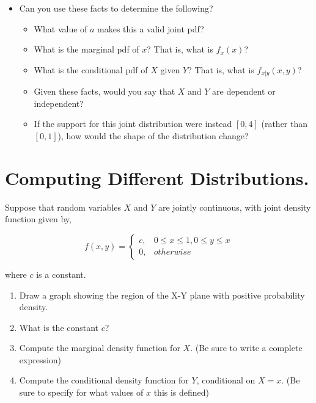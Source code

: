 \documentclass[
  letterpaper,
  DIV=11,
  numbers=noendperiod]{scrreprt}
\providecommand{\tightlist}{%
  \setlength{\itemsep}{0pt}\setlength{\parskip}{0pt}}\usepackage{longtable,booktabs,array}
\begin{document}
\begin{itemize}
\tightlist
\item
  Can you use these facts to determine the following?

  \begin{itemize}
  \tightlist
  \item
    What value of \(a\) makes this a valid joint pdf?
  \item
    What is the marginal pdf of \(x\)? That is, what is \(f_{x}(x)\)?
  \item
    What is the conditional pdf of \(X\) given \(Y\)? That is, what is
    \(f_{x|y}(x,y)\)?
  \item
    Given these facts, would you say that \(X\) and \(Y\) are dependent
    or independent?
  \item
    If the support for this joint distribution were instead \([0,4]\)
    (rather than \([0,1]\)), how would the shape of the distribution
    change?
  \end{itemize}
\end{itemize}

\section{Computing Different
Distributions.}\label{computing-different-distributions.}

Suppose that random variables \(X\) and \(Y\) are jointly continuous,
with joint density function given by,

\[
f(x,y) = 
  \begin{cases}
    c, & 0 \leq x \leq 1, 0 \leq y \leq x \\
    0, & otherwise
\end{cases}
\]

where \(c\) is a constant.

\begin{enumerate}
\def\labelenumi{\arabic{enumi}.}
\tightlist
\item
  Draw a graph showing the region of the X-Y plane with positive
  probability density.
\item
  What is the constant \(c\)?
\item
  Compute the marginal density function for \(X\). (Be sure to write a
  complete expression)
\item
  Compute the conditional density function for \(Y\), conditional on
  \(X=x\). (Be sure to specify for what values of \(x\) this is defined)
\end{enumerate}
\end{document}
